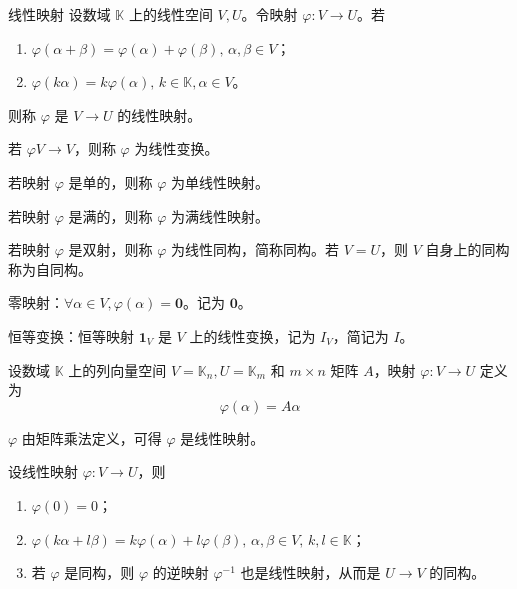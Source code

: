 \begin{definition}{线性映射}
  设数域 $\mathbb{K}$ 上的线性空间 $V,U$。令映射 $\varphi : V \to U$。若
  \begin{enumerate}
    \item $\varphi(\alpha + \beta) = \varphi(\alpha) + \varphi(\beta),\, \alpha,\beta \in V$；
    \item $\varphi(k\alpha) = k\varphi(\alpha),\, k \in \mathbb{K},\alpha \in V$。
  \end{enumerate}
  则称 $\varphi$ 是 $V \to U$ 的线性映射。

  若 $\varphi V \to V$，则称 $\varphi$ 为线性变换。

  若映射 $\varphi$ 是单的，则称 $\varphi$ 为单线性映射。

  若映射 $\varphi$ 是满的，则称 $\varphi$ 为满线性映射。

  若映射 $\varphi$ 是双射，则称 $\varphi$ 为线性同构，简称同构。若 $V = U$，则 $V$ 自身上的同构称为自同构。
\end{definition}

\hfill

\begin{example}
  零映射：$\forall \alpha \in V, \varphi(\alpha) = \mathbf{0}$。记为 $\mathbf{0}$。
\end{example}

\hfill

\begin{example}
  恒等变换：恒等映射 $\mathbf{1}_V$ 是 $V$ 上的线性变换，记为 $I_V$，简记为 $I$。
\end{example}

\hfill

\begin{example}\label{tag: example-1.7}
  设数域 $\mathbb{K}$ 上的列向量空间 $V = \mathbb{K}_n, U = \mathbb{K}_m$ 和 $m \times n$ 矩阵 $A$，映射 $\varphi : V \to U$ 定义为
  \[\varphi(\alpha) = A\alpha\]

  $\varphi$ 由矩阵乘法定义，可得 $\varphi$ 是线性映射。
\end{example}

\hfill

\begin{proposition}
  设线性映射 $\varphi : V \to U$，则
  \begin{enumerate}
    \item $\varphi(0) = 0$；
    \item $\varphi(k\alpha + l\beta) = k\varphi(\alpha) + l\varphi(\beta),\, \alpha,\beta \in V,\, k,l \in \mathbb{K}$；
    \item 若 $\varphi$ 是同构，则 $\varphi$ 的逆映射 $\varphi^{-1}$ 也是线性映射，从而是 $U \to V$ 的同构。
  \end{enumerate}
\end{proposition}



